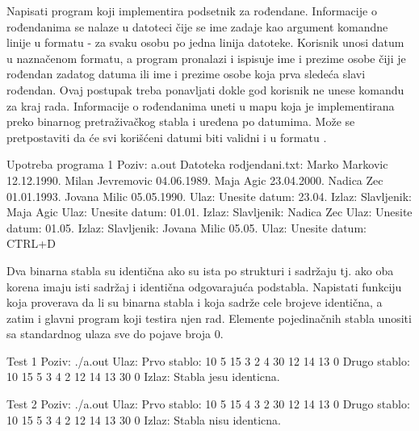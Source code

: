 \begin{Exercise}[label=706, difficulty=1]
Napisati program koji implementira podsetnik za rođendane. Informacije o rođendanima se nalaze u datoteci čije se ime zadaje kao argument komandne linije u formatu  - za svaku osobu po jedna linija datoteke. Korisnik unosi datum u naznačenom formatu, a program pronalazi i ispisuje ime i prezime osobe čiji je rođendan zadatog datuma ili ime i prezime osobe koja prva sledeća slavi rođendan. Ovaj postupak treba ponavljati dokle god korisnik ne unese komandu za kraj rada. Informacije o rođendanima uneti u mapu koja je implementirana preko binarnog pretraživačkog stabla i uređena po datumima. Može se pretpostaviti da će svi korišćeni datumi biti validni i u formatu .
\begin{maxitest}
\begin{test}{Upotreba programa 1}
Poziv: a.out
Datoteka rodjendani.txt:
	Marko Markovic 12.12.1990.
	Milan Jevremovic 04.06.1989.
	Maja Agic 23.04.2000.
	Nadica Zec 01.01.1993.
	Jovana Milic 05.05.1990.
Ulaz:
	Unesite datum: 23.04.
Izlaz:
	Slavljenik: Maja Agic 
Ulaz:	
	Unesite datum: 01.01.
Izlaz:
	Slavljenik: Nadica Zec
Ulaz:
	Unesite datum: 01.05.
Izlaz:	
	Slavljenik: Jovana Milic 05.05.
Ulaz:	
	Unesite datum: CTRL+D
\end{test}
\end{maxitest}
\end{Exercise}

\begin{Answer}[ref=706]
\end{Answer}



\begin{Exercise}[label=707]
Dva binarna stabla su identična ako su ista po strukturi i sadržaju tj. ako oba korena imaju isti sadržaj i identična odgovarajuća podstabla. Napistati funkciju  koja proverava da li su binarna stabla  i  koja sadrže cele brojeve identična, a zatim i glavni program koji testira njen rad. Elemente pojedinačnih stabla unositi sa standardnog ulaza sve do pojave broja $0$.

\begin{maxitest}
\begin{test}{Test 1}
Poziv: ./a.out
Ulaz:
	Prvo stablo: 10 5 15 3 2 4 30 12 14 13 0
	Drugo stablo: 10 15 5 3 4 2 12 14 13 30 0
Izlaz:
	Stabla jesu identicna.
\end{test}
\end{maxitest}

\begin{maxitest}
\begin{test}{Test 2}
Poziv: ./a.out
Ulaz:
	Prvo stablo: 10 5 15 4 3 2 30 12 14 13 0
	Drugo stablo: 10 15 5 3 4 2 12 14 13 30 0
Izlaz:
	Stabla nisu identicna.
\end{test}
\end{maxitest}

\end{Exercise}

